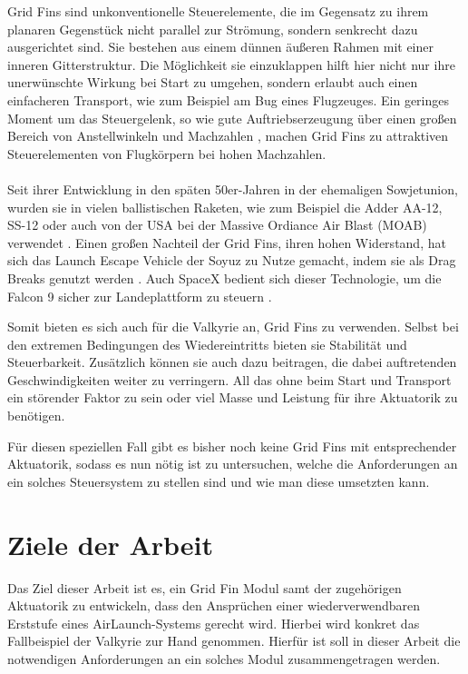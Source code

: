Grid Fins sind unkonventionelle Steuerelemente, die im Gegensatz zu ihrem planaren Gegenstück nicht parallel zur Strömung, sondern senkrecht dazu ausgerichtet sind. Sie bestehen aus einem dünnen äußeren Rahmen mit einer inneren Gitterstruktur. Die Möglichkeit sie einzuklappen hilft hier nicht nur ihre unerwünschte Wirkung bei Start zu umgehen, sondern erlaubt auch einen einfacheren Transport, wie zum Beispiel am Bug eines Flugzeuges. Ein geringes Moment um das Steuergelenk, so wie gute Auftriebserzeugung über einen großen Bereich von Anstellwinkeln und Machzahlen \cite{vergleichPlanar}, machen Grid Fins zu attraktiven Steuerelementen von Flugkörpern bei hohen Machzahlen.
\\~\\
Seit ihrer Entwicklung in den späten 50er-Jahren in der ehemaligen Sowjetunion, wurden sie in vielen ballistischen Raketen, wie zum Beispiel die Adder AA-12, SS-12 oder auch von der USA bei der Massive Ordiance Air Blast (MOAB) verwendet \cite{sehnenlaenge}. Einen großen Nachteil der Grid Fins, ihren hohen Widerstand, hat sich das Launch Escape Vehicle der Soyuz zu Nutze gemacht, indem sie als Drag Breaks genutzt werden \cite{sehnenlaenge}. Auch SpaceX bedient sich dieser Technologie, um die Falcon 9 sicher zur Landeplattform zu steuern \cite{sehnenlaenge}.

Somit bieten es sich auch für die Valkyrie an, Grid Fins zu verwenden. Selbst bei den extremen Bedingungen des Wiedereintritts bieten sie Stabilität und Steuerbarkeit. Zusätzlich können sie auch dazu beitragen, die dabei auftretenden Geschwindigkeiten weiter zu verringern. All das ohne beim Start und Transport ein störender Faktor zu sein oder viel Masse und Leistung für ihre Aktuatorik zu benötigen.

Für diesen speziellen Fall gibt es bisher noch keine Grid Fins mit entsprechender Aktuatorik, sodass es nun nötig ist zu untersuchen, welche die Anforderungen an ein solches Steuersystem zu stellen sind und wie man diese umsetzten kann.

\section{Ziele der Arbeit}
Das Ziel dieser Arbeit ist es, ein Grid Fin Modul samt der zugehörigen Aktuatorik zu entwickeln, dass den Ansprüchen einer wiederverwendbaren Erststufe eines AirLaunch-Systems gerecht wird. Hierbei wird konkret das Fallbeispiel der Valkyrie zur Hand genommen.
Hierfür ist soll in dieser Arbeit die notwendigen Anforderungen an ein solches Modul zusammengetragen werden.


